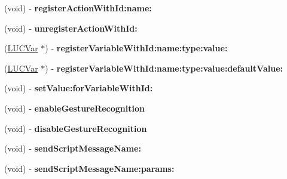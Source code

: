 \begin{DoxyCompactItemize}
(void) -\/ {\bfseries register\+Action\+With\+Id\+:name\+:}
\item 
\mbox{\label{interface_l_u_console_plugin_a5a9aeb0d2d8a30bb95e89437f34ba829}} 
(void) -\/ {\bfseries unregister\+Action\+With\+Id\+:}
\item 
\mbox{\label{interface_l_u_console_plugin_a6fb0e9daedcfe0151fac0c3dfcbc871a}} 
(\mbox{\hyperlink{interface_l_u_c_var}{L\+U\+C\+Var}} $\ast$) -\/ {\bfseries register\+Variable\+With\+Id\+:name\+:type\+:value\+:}
\item 
\mbox{\label{interface_l_u_console_plugin_abf08001e2a5bc7a62ec455a6445a27d8}} 
(\mbox{\hyperlink{interface_l_u_c_var}{L\+U\+C\+Var}} $\ast$) -\/ {\bfseries register\+Variable\+With\+Id\+:name\+:type\+:value\+:default\+Value\+:}
\item 
\mbox{\label{interface_l_u_console_plugin_a2c1010cacae1794aaf4b5063e2e4f8ea}} 
(void) -\/ {\bfseries set\+Value\+:for\+Variable\+With\+Id\+:}
\item 
\mbox{\label{interface_l_u_console_plugin_a4f493831888378f7c50f20c55dea5128}} 
(void) -\/ {\bfseries enable\+Gesture\+Recognition}
\item 
\mbox{\label{interface_l_u_console_plugin_a8b47b6a0db21749e6806d0e20fbc4f77}} 
(void) -\/ {\bfseries disable\+Gesture\+Recognition}
\item 
\mbox{\label{interface_l_u_console_plugin_a5d14ce9deb0b2e327070c8eada9a0f60}} 
(void) -\/ {\bfseries send\+Script\+Message\+Name\+:}
\item 
\mbox{\label{interface_l_u_console_plugin_a4827856ead60e72050f5d9b48c256f7a}} 
(void) -\/ {\bfseries send\+Script\+Message\+Name\+:params\+:}
\end{DoxyCompactItemize}
